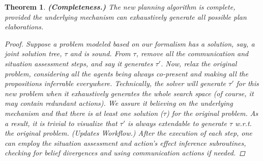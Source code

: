 \documentclass[letterpaper]{article} %
\newtheorem{theorem}{Theorem}[section]
\begin{document}
\begin{theorem}
\textbf{(Completeness.)} The new planning algorithm is complete, provided the underlying mechanism can exhaustively generate all possible plan elaborations. 
\vspace{-0.06in}
\begin{proof}
Suppose a problem modeled based on our formalism has a solution, say, a joint solution tree, $\tau$ and is sound. 
From $\tau$, remove all the communication and situation assessment steps, and say it generates $\tau'$. Now, relax the original problem, considering all the agents being always co-present and making all the propositions \textit{inferrable} everywhere. 
Technically, the solver will generate $\tau'$ for this new problem when it exhaustively generates the whole search space (of course, it may contain redundant actions). 
We assure it believing on the underlying mechanism and that there is at least one solution ($\tau$) for the original problem. As a result, it is trivial to visualize that $\tau'$ is always extendable to generate $\tau$ w.r.t. the original problem. (\textit{Updates Workflow}.) After the execution of each step, one can employ the situation assessment and action's effect inference subroutines, checking for belief divergences and using communication actions if needed. 
\end{proof}
\end{theorem}
\end{document}
